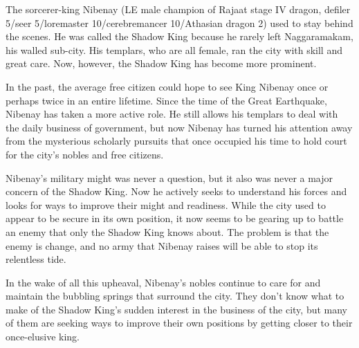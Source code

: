 {

	The sorcerer-king Nibenay (LE male champion of Rajaat stage IV dragon, defiler 5/seer 5/loremaster 10/cerebremancer 10/Athasian dragon 2) used to stay behind the scenes. He was called the Shadow King because he rarely left Naggaramakam, his walled sub-city. His templars, who are all female, ran the city with skill and great care. Now, however, the Shadow King has become more prominent.

	In the past, the average free citizen could hope to see King Nibenay once or perhaps twice in an entire lifetime. Since the time of the Great Earthquake, Nibenay has taken a more active role. He still allows his templars to deal with the daily business of government, but now Nibenay has turned his attention away from the mysterious scholarly pursuits that once occupied his time to hold court for the city's nobles and free citizens.

	Nibenay's military might was never a question, but it also was never a major concern of the Shadow King. Now he actively seeks to understand his forces and looks for ways to improve their might and readiness. While the city used to appear to be secure in its own position, it now seems to be gearing up to battle an enemy that only the Shadow King knows about. The problem is that the enemy is change, and no army that Nibenay raises will be able to stop its relentless tide.

	In the wake of all this upheaval, Nibenay's nobles continue to care for and maintain the bubbling springs that surround the city. They don't know what to make of the Shadow King's sudden interest in the business of the city, but many of them are seeking ways to improve their own positions by getting closer to their once-elusive king.
}
